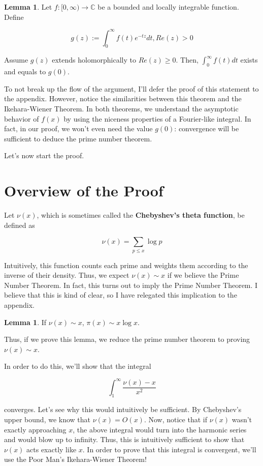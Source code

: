 \documentclass{article}
\theoremstyle{definition}
\newtheorem{lemma}[theorem]{Lemma}
\newcommand{\C}{\mathbb{C}}
\begin{document}
\begin{lemma}
    Let $ f:[0,\infty) \xrightarrow{} \C$ be a bounded and locally integrable function.
    Define 

    \[ g(z) := \int_{0}^{\infty} f(t) e^{-tz} dt, Re(z) > 0 \]

    Assume $ g(z) $ extends holomorphically to $ Re(z) \geq 0 $.
    Then, $ \int_{0}^{\infty} f(t) dt $ exists and equals to $ g(0) $.
\end{lemma}

To not break up the flow of the argument, I'll defer the proof of this statement to the appendix.
However, notice the similarities between this theorem and the Ikehara-Wiener Theorem.
In both theorems, we understand the asymptotic behavior of $ f(x) $ by using the
niceness properties of a Fourier-like integral. In fact, in our proof, we won't even need
the value $ g(0) $: convergence will be sufficient to deduce the prime number theorem.

Let's now start the proof.

\section{Overview of the Proof}

Let $ \nu(x) $, which is sometimes called the \textbf{Chebyshev's theta function},
be defined as 

\[ \nu(x) = \sum_{p \leq x} \log p \]

Intuitively, this function
counts each prime and weights them according to the inverse of their density.
Thus, we expect $ \nu(x) \sim x $ if we believe the Prime Number Theorem.
In fact, this turns out to imply the Prime Number Theorem. I believe that this
is kind of clear, so I have relegated this implication to the appendix.

\begin{lemma}
    If $ \nu(x) \sim x $, $ \pi(x) \sim x \log x $.
\end{lemma}

Thus, if we prove this lemma, we reduce the prime number theorem to proving $ \nu(x) \sim x $.

In order to do this, we'll show that the integral 

\[ \int_{1}^{\infty} \frac{\nu(x) - x}{x^{2}} \]

converges. Let's see why this would intuitively be sufficient. By Chebyshev's upper bound,
we know that $ \nu(x) = O(x) $. Now, notice that if $ \nu(x) $ wasn't exactly approaching $ x $,
the above integral would turn into the harmonic series and would blow up to infinity. Thus, this is intuitively
sufficient to show that $ \nu(x) $ acts exactly like $ x $. In order to prove that this
integral is convergent, we'll use the Poor Man's Ikehara-Wiener Theorem!
\end{document}
